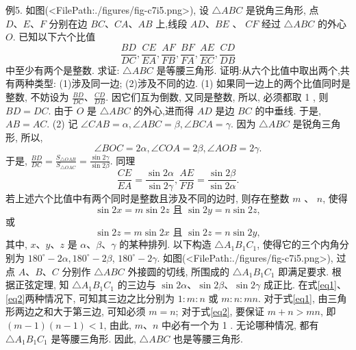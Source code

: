 例5. 如图(<FilePath:./figures/fig-c7i5.png>), 设 $\triangle A B C$ 是锐角三角形, 点 $D 、 E 、 F$ 分别在边 $B C 、 C A 、 A B$ 上,线段 $A D 、 B E$ 、 $C F$ 经过 $\triangle A B C$ 的外心 $O$. 已知以下六个比值
$$
\frac{B D}{D C}, \frac{C E}{E A}, \frac{A F}{F B}, \frac{B F}{F A}, \frac{A E}{E C}, \frac{C D}{D B}
$$
中至少有两个是整数.
求证: $\triangle A B C$ 是等腰三角形.
证明:从六个比值中取出两个,共有两种类型:
(1)涉及同一边; (2)涉及不同的边.
(1) 如果同一边上的两个比值同时是整数, 不妨设为 $\frac{B D}{D C} 、 \frac{C D}{D B}$. 因它们互为倒数, 又同是整数, 所以, 必须都取 1 , 则 $B D=D C$.
由于 $O$ 是 $\triangle A B C$ 的外心,进而得 $A D$ 是边 $B C$ 的中垂线.
于是, $A B=A C$.
(2) 记 $\angle C A B=\alpha, \angle A B C=\beta, \angle B C A=\gamma$.
因为 $\triangle A B C$ 是锐角三角形, 所以,
$$
\angle B O C=2 \alpha, \angle C O A=2 \beta, \angle A O B=2 \gamma .
$$
于是, $\frac{B D}{D C}=\frac{S_{\triangle O A B}}{S_{\triangle O A C}}=\frac{\sin 2 \gamma}{\sin 2 \beta}$.
同理
$$
\frac{C E}{E A}=\frac{\sin 2 \alpha}{\sin 2 \gamma}, \frac{A E}{F B}=\frac{\sin 2 \beta}{\sin 2 \alpha} .
$$
若上述六个比值中有两个同时是整数且涉及不同的边时, 则存在整数 $m$ 、 $n$, 使得
$$
\sin 2 x=m \sin 2 z \text { 且 } \sin 2 y=n \sin 2 z, \label{eq1}
$$
或
$$
\sin 2 z=m \sin 2 x \text { 且 } \sin 2 z=n \sin 2 y, \label{eq2}
$$
其中, $x 、 y 、 z$ 是 $\alpha 、 \beta 、 \gamma$ 的某种排列.
以下构造 $\triangle A_1 B_1 C_1$, 使得它的三个内角分别为 $180^{\circ}-2 \alpha, 180^{\circ}-2 \beta$, $180^{\circ}-2 \gamma$.
如图(<FilePath:./figures/fig-c7i5.png>), 过点 $A 、 B 、 C$ 分别作 $\triangle A B C$ 外接圆的切线, 所围成的 $\triangle A_1 B_1 C_1$ 即满足要求.
根据正弦定理, 知 $\triangle A_1 B_1 C_1$ 的三边与 $\sin 2 \alpha 、 \sin 2 \beta 、 \sin 2 \gamma$ 成正比.
在式\ref{eq1}、\ref{eq2}两种情况下, 可知其三边之比分别为 $1: m: n$ 或 $m: n: m n$.
对于式\ref{eq1}, 由三角形两边之和大于第三边, 可知必须 $m=n$;
对于式\ref{eq2}, 要保证 $m+n>m n$, 即 $(m-1)(n-1)<1$, 由此, $m 、 n$ 中必有一个为 1 .
无论哪种情况, 都有 $\triangle A_1 B_1 C_1$ 是等腰三角形.
因此, $\triangle A B C$ 也是等腰三角形.



